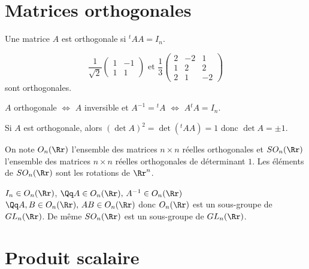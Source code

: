 \documentclass[class=report,crop=false]{standalone}
\begin{document}
\section{Matrices orthogonales}

\begin{definition}
 Une matrice $A$ est orthogonale si ${}^t\!AA=I_n$.


\end{definition}

\begin{exemple}
\[\frac{1}{\sqrt{2}}\left(\begin{array}{cc}
1&-1\\
1&1
\end{array}\right) \text{ et } \frac{1}{3}\left(\begin{array}{ccc}
2&-2&1\\
1&2&2\\
2&1&-2
\end{array}\right)\] sont orthogonales.\end{exemple}

\begin{remarque*}
$A$ orthogonale $\iff$ $A$ inversible et $A^{-1} = {}^tA$ $\iff$ $A{}^t\!A = I_n$.
\end{remarque*}

\begin{remarque*}
Si $A$ est orthogonale, alors $(\det A)^2 = \det ({}^t\!AA) = 1$ donc $\det A = \pm 1$.
\end{remarque*}

\begin{definition}
On note $O_n(\Rr)$ l'ensemble des matrices $n \times n$ réelles orthogonales et $SO_n(\Rr)$ l'ensemble des matrices $n \times n$ réelles orthogonales de déterminant $1$. Les éléments de $SO_n(\Rr)$ sont les rotations de $\Rr^n$.
 \end{definition}

\begin{remarque*}
$I_n \in O_n(\Rr)$, $\Qq A \in O_n(\Rr),\, A^{-1} \in O_n(\Rr)$ $\Qq A,B \in  O_n(\Rr),\, AB \in O_n(\Rr)$ donc $O_n(\Rr)$ est un sous-groupe de $GL_n(\Rr)$. De même $SO_n(\Rr)$ est un sous-groupe de $GL_n(\Rr)$.
\end{remarque*}


\section{Produit scalaire}
\end{document}
